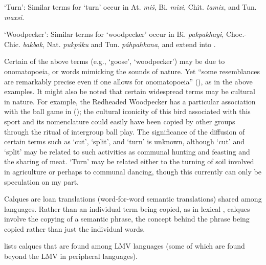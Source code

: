 \documentclass[output=paper]{LSP/langsci}
\begin{document}
\ea  \parbox[t]{.9\textwidth}{`Turn': Similar terms for `turn' occur in At. \emph{miš}, Bi. \emph{mixi}, Chit. \emph{tamix}, and Tun. \emph{maxsi}.}
\z

\ea  \parbox[t]{.9\textwidth}{`Woodpecker': Similar terms for `woodpecker' occur in Bi. \emph{pakpakhayi}, Choc.-Chic. \emph{bakbak}, Nat. \emph{pukpúku} and Tun. \emph{páhpahkana}, and extend into .}
\z

Certain of the above terms (e.g., `goose', `woodpecker') may be due to ono\-ma\-to\-poeia, or words mimicking the sounds of nature. Yet “some resemblances are remarkably precise even if one allows for onomatopoeia” (\citealt[82]{Haas1969}), as in the above examples. It might also be noted that certain widespread terms may be cultural in nature. For example, the Redheaded Woodpecker has a particular association with the ball game in  (\citealt[34--37]{Galvan2011}); the cultural iconicity of this bird associated with this sport and its nomenclature could easily have been copied by other groups through the ritual of intergroup ball play. The significance of the diffusion of certain terms such as `cut', `split', and `turn' is unknown, although `cut' and `split' may be related to such activities as communal hunting and feasting and the sharing of meat. `Turn' may be related either to the turning of soil involved in agriculture or perhaps to communal dancing, though this currently can only be speculation on my part. 

Calques are loan translations (word-for-word semantic translations) shared among languages. Rather than an individual term being copied, as in lexical , calques involve the copying of a semantic phrase, the concept behind the phrase being copied rather than just the individual words.

 lists calques that are found among LMV languages (some of which are found beyond the LMV in peripheral languages). 
\end{document}
